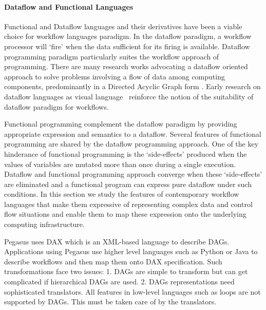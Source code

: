 \paragraph{Dataflow and Functional Languages} Functional and Dataflow languages
and their derivatives have been a viable choice for workflow languages
paradigm. In the dataflow paradigm, a workflow processor will `fire' when the
data sufficient for its firing is available. Dataflow programming paradigm
particularly suites the workflow approach of programming. There are many
research works advocating a dataflow oriented approach to solve problems
involving a flow of data among computing components, predominantly in a
Directed Acyclic Graph form \cite{dataflow,lee-messerschmitt:1987}. Early
research on dataflow languages as visual language~\cite{sutherland:1966}
reinforce the notion of the suitability of dataflow paradigm for workflows.

Functional programming complement the dataflow paradigm by providing
appropriate expression and semantics to a dataflow. Several features of
functional programming are shared by the dataflow programming approach. One of
the key hinderance of functional programming is the `side-effects' produced
when the values of variables are mutated more than once during a single
execution. Dataflow and functional programming approach converge when these
`side-effects' are eliminated and a functional program can express pure
dataflow under such conditions. 
In this section we study the features of contemporary workflow languages that
make them expressive of representing complex data and control flow situations
and enable them to map these expression onto the underlying computing
infrastructure.

Pegasus uses DAX which is an XML-based language to describe DAGs. Applications
using Pegasus use higher level languages such as Python or Java to describe
workflows and then map them onto DAX specification. Such transformations face
two issues: 1. DAGs are simple to transform but can get complicated if
hierarchical DAGs are used. 2. DAGs representations need sophisticated
translators. All features in low-level languages such as loops are not
supported by DAGs. This must be taken care of by the translators.


